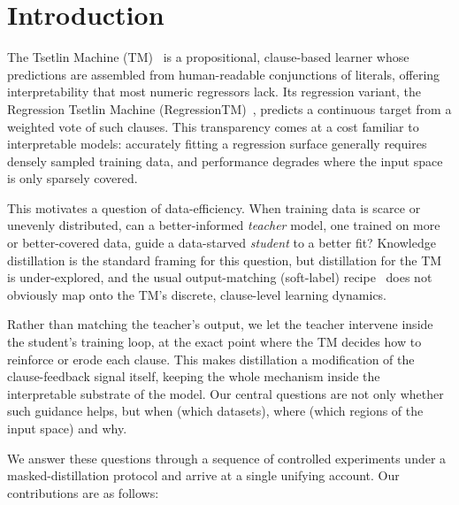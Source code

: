 \section{Introduction}
\label{sec:intro}

The Tsetlin Machine (TM)~\cite{granmo2019convtm} is a propositional, clause-based
learner whose predictions are assembled from human-readable conjunctions of literals,
offering interpretability that most numeric regressors lack. Its regression variant, the
Regression Tsetlin Machine (RegressionTM)~\cite{abeyrathna2020regression}, predicts a
continuous target from a weighted vote of such clauses. This transparency comes at a cost
familiar to interpretable models: accurately fitting a regression surface generally
requires densely sampled training data, and performance degrades where the input space is
only sparsely covered.

This motivates a question of data-efficiency. When training data is scarce or unevenly
distributed, can a better-informed \textit{teacher} model, one trained on more or
better-covered data, guide a data-starved \textit{student} to a better fit? Knowledge
distillation is the standard framing for this question, but distillation for the TM is
under-explored, and the usual output-matching (soft-label) recipe~\cite{hinton2015distilling}
does not obviously map onto the TM's discrete, clause-level learning dynamics.

Rather than matching the teacher's output, we let the teacher
intervene inside the student's training loop, at the exact point where the TM decides how
to reinforce or erode each clause. This makes distillation a modification of the
clause-feedback signal itself, keeping the whole mechanism inside the interpretable
substrate of the model. Our central questions are not only whether such guidance helps,
but when (which datasets), where (which regions of the input space) and why.

We answer these questions through a sequence of controlled experiments under a masked-distillation
protocol and arrive at a single unifying account. Our contributions are as follows:

